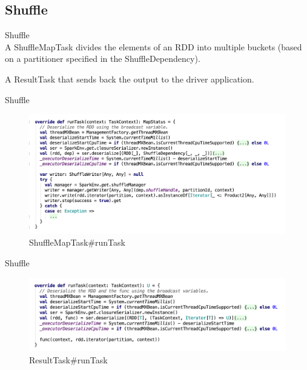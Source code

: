 \subsection{Shuffle}
\begin{frame}[plain,t]{Shuffle} %
	 \\  \vspace{2ex}
	A ShuffleMapTask divides the elements of an RDD into multiple buckets 
	(based on a partitioner specified in the ShuffleDependency).
	
	 \vspace{2ex} 
	 
	A ResultTask that sends back the output to the driver application.
\end{frame}
\begin{frame}[plain,t]{Shuffle} %
	 \\  \vspace{2ex}
	\begin{figure}
		\centering
		\includegraphics[width=1\linewidth]{images/maptask001}
		\caption{ShuffleMapTask\#runTask}
		\label{fig:maptask001}
	\end{figure}
	
\end{frame}
\begin{frame}[plain,t]{Shuffle} %
	 \\  \vspace{2ex}
	\begin{figure}
		\centering
		\includegraphics[width=1\linewidth]{images/resulttask001}
		\caption{ResultTask\#runTask}
		\label{fig:resulttask001}
	\end{figure}
	
\end{frame}
